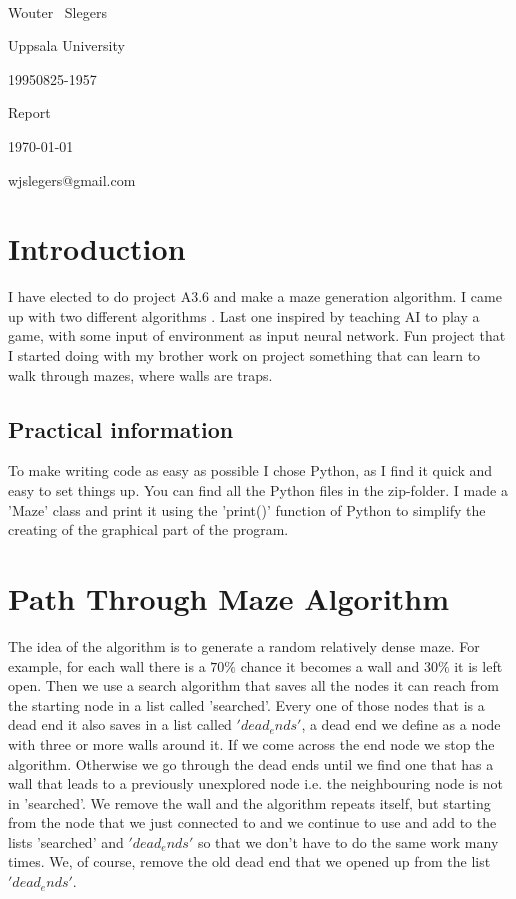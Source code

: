 \documentclass[10pt, a4paper, twoside]{amsart}
\makeatletter
\newcommand{\1}{\mathbbm{1}}
\newcommand\textbox[1]{
  \parbox{.333\textwidth}{#1}}
\newcommand{\courseName} {A3.6 Maze Generation}
\newcommand{\firstName}  {Wouter}
\newcommand{\lastName}   {Slegers}
\newcommand{\studId}     {19950825-1957}
\renewcommand{\email}    {wjslegers@gmail.com}
\makeatother
\begin{document}
\noindent{\huge\bf \courseName}\\
\noindent\textbox{\sc \firstName~ \lastName \hfill}\textbox{\hfil Uppsala University \hfil}\textbox{\hfill \studId}
\noindent\textbox{\large\sc Report \hfill}\textbox{\hfil \today \hfil}\textbox{\hfill \email}
\bigskip


\section*{Introduction}
I have elected to do project A3.6 and make a maze generation algorithm. I came up with two different algorithms .
Last one inspired by teaching AI to play a game, with some input of environment as input neural network. Fun project that I started doing with my brother work on project something that can learn to walk through mazes, where walls are traps.

\subsection*{Practical information}
To make writing code as easy as possible I chose Python, as I find it quick and easy to set things up. 
You can find all the Python files in the zip-folder.
I made a 'Maze' class and print it using the 'print()' function of Python to simplify the creating of the graphical part of the program. 


\section{Path Through Maze Algorithm}
The idea of the algorithm is to generate a random relatively dense maze. For example, for each wall there is a $70\%$ chance it becomes a wall and $30\%$ it is left open. Then we use a search algorithm that saves all the nodes it can reach from the starting node in a list called 'searched'. Every one of those nodes that is a dead end it also saves in a list called $'dead_ends'$, a dead end we define as a node with three or more walls around it. If we come across the end node we stop the algorithm. Otherwise we go through the dead ends until we find one that has a wall that leads to a previously unexplored node i.e. the neighbouring node is not in 'searched'. We remove the wall and the algorithm repeats itself, but starting from the node that we just connected to and we continue to use and add to the lists 'searched' and $'dead_ends'$ so that we don't have to do the same work many times. We, of course, remove the old dead end that we opened up from the list $'dead_ends'$.
\end{document}
